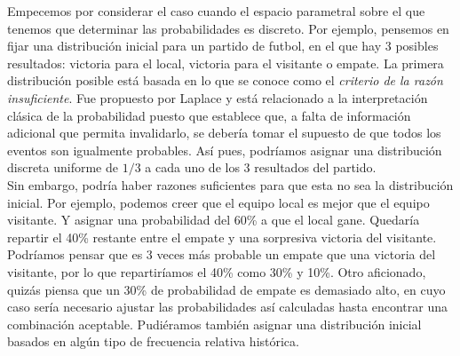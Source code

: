 Empecemos por considerar el caso cuando el espacio parametral sobre el que tenemos que determinar las probabilidades es discreto. Por ejemplo, pensemos en fijar una distribución inicial para un partido de futbol, en el que hay 3 posibles resultados: victoria para el local, victoria para el visitante o empate. La primera distribución posible está basada en lo que se conoce como el \textit{criterio de la razón insuficiente}. Fue propuesto por Laplace y está relacionado a la interpretación clásica de la probabilidad puesto que establece que, a falta de información adicional que permita invalidarlo, se debería tomar el supuesto de que todos los eventos son igualmente probables. Así pues, podríamos asignar una distribución discreta uniforme de $1/3$ a cada uno de los 3 resultados del partido.\\

Sin embargo, podría haber razones suficientes para que esta no sea la distribución inicial. Por ejemplo, podemos creer que el equipo local es mejor que el equipo visitante. Y asignar una probabilidad del  60\% a que el local gane. Quedaría repartir el 40\% restante entre el empate y una sorpresiva victoria del visitante. Podríamos pensar que es 3 veces más probable un empate que una victoria del visitante, por lo que repartiríamos el 40\% como 30\% y 10\%. Otro aficionado, quizás piensa que un 30\% de probabilidad de empate es demasiado alto, en cuyo caso sería necesario ajustar las probabilidades así calculadas hasta encontrar una combinación aceptable. Pudiéramos también asignar una distribución inicial basados en algún tipo de frecuencia relativa histórica.\\ 


